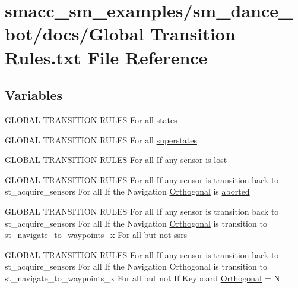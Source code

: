 \hypertarget{Global_01Transition_01Rules_8txt}{}\section{smacc\+\_\+sm\+\_\+examples/sm\+\_\+dance\+\_\+bot/docs/\+Global Transition Rules.\+txt File Reference}
\label{Global_01Transition_01Rules_8txt}
\subsection*{Variables}
\begin{DoxyCompactItemize}
\item 
G\+L\+O\+B\+AL T\+R\+A\+N\+S\+I\+T\+I\+ON R\+U\+L\+ES For all \hyperlink{Global_01Transition_01Rules_8txt_a54d1602740c77675ed14ebfe688f4374}{states}
\item 
G\+L\+O\+B\+AL T\+R\+A\+N\+S\+I\+T\+I\+ON R\+U\+L\+ES For all \hyperlink{Global_01Transition_01Rules_8txt_af31ae27f561335eed0d5161d8ee256f8}{superstates}
\item 
G\+L\+O\+B\+AL T\+R\+A\+N\+S\+I\+T\+I\+ON R\+U\+L\+ES For all If any sensor is \hyperlink{Global_01Transition_01Rules_8txt_a21166d43cc40d1ae31189d3fe91d8346}{lost}
\item 
G\+L\+O\+B\+AL T\+R\+A\+N\+S\+I\+T\+I\+ON R\+U\+L\+ES For all If any sensor is transition back to st\+\_\+acquire\+\_\+sensors For all If the Navigation \hyperlink{Global_01Transition_01Rules_8txt_a2e1cdec29dad5013e514270d0a78fe22}{Orthogonal} is \hyperlink{Global_01Transition_01Rules_8txt_a682ac6cc3cf2eeec69ad3f310ae363ea}{aborted}
\item 
G\+L\+O\+B\+AL T\+R\+A\+N\+S\+I\+T\+I\+ON R\+U\+L\+ES For all If any sensor is transition back to st\+\_\+acquire\+\_\+sensors For all If the Navigation \hyperlink{Global_01Transition_01Rules_8txt_a2e1cdec29dad5013e514270d0a78fe22}{Orthogonal} is transition to st\+\_\+navigate\+\_\+to\+\_\+waypoints\+\_\+x For all but not \hyperlink{Global_01Transition_01Rules_8txt_aa881c6a22397113c3342bf4c44212934}{ssrs}
\item 
G\+L\+O\+B\+AL T\+R\+A\+N\+S\+I\+T\+I\+ON R\+U\+L\+ES For all If any sensor is transition back to st\+\_\+acquire\+\_\+sensors For all If the Navigation Orthogonal is transition to st\+\_\+navigate\+\_\+to\+\_\+waypoints\+\_\+x For all but not If Keyboard \hyperlink{Global_01Transition_01Rules_8txt_a2e1cdec29dad5013e514270d0a78fe22}{Orthogonal} = N

\end{DoxyCompactItemize}
